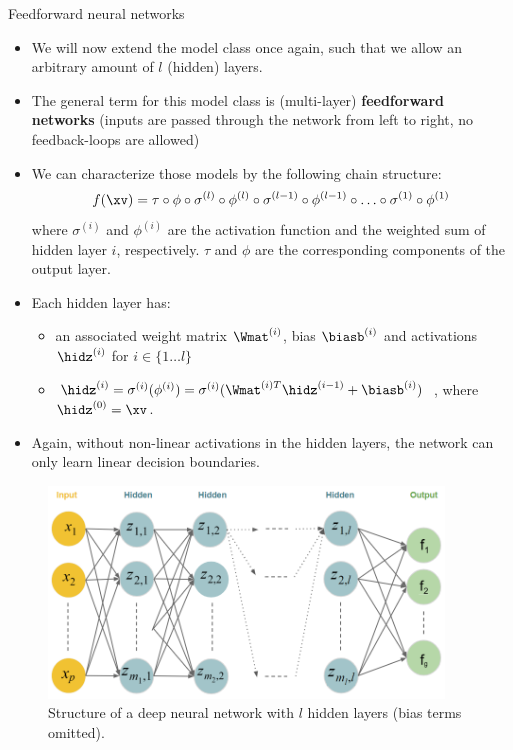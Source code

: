 \begin{vbframe}{Feedforward neural networks}
\begin{itemize}
\vspace{15mm}
\item We will now extend the model class once again, such that we allow an arbitrary amount of $l$ (hidden) layers.
\vspace{5mm}
\item The general term for this model class is (multi-layer) \textbf{feedforward networks} (inputs are passed through the network from left to right, no feedback-loops are allowed)
\end{itemize}
\framebreak

\begin{itemize}
\item We can characterize those models by the following chain structure: $$f(\xv) = \tau \circ \phi \circ \sigma^{(l)} \circ \phi^{(l)} \circ \sigma^{(l-1)} \circ \phi^{(l-1)} \circ \ldots \circ \sigma^{(1)} \circ \phi^{(1)}$$ where $\sigma^{(i)}$ and $\phi^{(i)}$ are the activation function and the weighted sum of hidden layer $i$, respectively. $\tau$ and $\phi$ are the corresponding components of the output layer.
\vspace{5mm}
\item Each hidden layer has: 
\begin{itemize}
\vspace{2mm}
\item an associated weight matrix $\Wmat^{(i)}$, bias $\biasb^{(i)}$ and activations $\hidz^{(i)}$ for $i \in \{ 1 \ldots l\}$
\vspace{2mm}
\item $\hidz^{(i)} = \sigma^{(i)}(\phi^{(i)}) = \sigma^{(i)}(\Wmat^{(i)T}\hidz^{(i - 1)} + \biasb^{(i)})$ , where $\hidz^{(0)} = \xv$.
\end{itemize}
\vspace{5mm}
\item Again, without non-linear activations in the hidden layers, the network can only learn linear decision boundaries.
  \end{itemize}
\framebreak

\lz
\begin{figure}
\centering
\includegraphics[width=10.5cm]{figure/deepneuralnet_new.png}
\caption{Structure of a deep neural network with $l$ hidden layers (bias terms omitted).}
  \end{figure}
\end{vbframe}  


